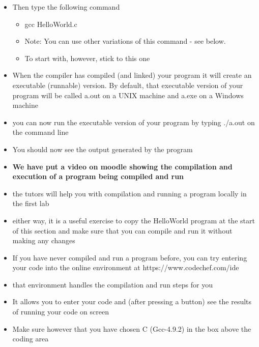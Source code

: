 \documentclass{beamer}
\begin{document}
\begin{frame}
\begin{itemize}
\item Then type the following command
\begin{itemize}
\item gcc HelloWorld.c  
\item Note: You can use other variations of this command - see below. 
\item To start with, however, stick to this one
\end{itemize}

\item When the compiler has compiled (and linked) your program it will create an executable (runnable) version. By
default, that executable version of your program will be called a.out on a UNIX machine and a.exe on a Windows machine
\item you can now run the executable version of your program by typing ./a.out on the command line 
\item You should now see the output generated by the program 
\end{itemize}
\end{frame}

\begin{frame}
\begin{itemize}
\item \textbf{We have put a video on moodle showing the compilation and execution of a program being compiled and run}
\item the tutors will help you with compilation and running a program locally in the first lab
\item either way, it is a useful exercise to copy the HelloWorld program at the start of this section and make sure that you can compile and run it without making any changes
\end{itemize}
\end{frame}


\begin{frame}
\begin{itemize}
\item If you have never compiled and run a program before, you can try entering your code into the online environment at https://www.codechef.com/ide
\item that environment handles the compilation and run steps for you
\item It allows you to enter your code and (after pressing a button) see the results of running your code on screen
\item Make sure however that you have chosen C (Gcc-4.9.2) in the box above the coding area
\end{itemize}
\end{frame}
\end{document}
